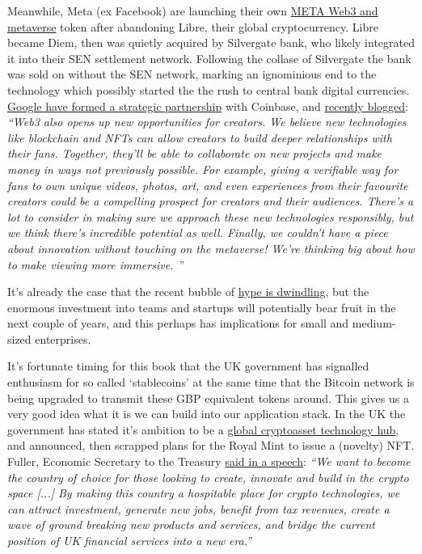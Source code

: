 Meanwhile, Meta (ex Facebook) are launching their own \href{https://archive.ph/coyp2}{META Web3 and metaverse} token after abandoning Libre, their global cryptocurrency. Libre became Diem, then was quietly acquired by Silvergate bank, who likely integrated it into their SEN settlement network. Following the collase of Silvergate the bank was sold on without the SEN network, marking an ignominious end to the technology which possibly started the the rush to central bank digital currencies. \href{https://www.coinbase.com/blog/announcing-coinbase-google-cloud}{Google have formed a strategic partnership} with Coinbase, and \href{https://blog.youtube/inside-youtube/innovations-for-2022-at-youtube/}{recently blogged}: \textit{``Web3 also opens up new opportunities for creators. We believe new technologies like blockchain and NFTs can allow creators to build deeper relationships with their fans. Together, they'll be able to collaborate on new projects and make money in ways not previously possible. For example, giving a verifiable way for fans to own unique videos, photos, art, and even experiences from their favourite creators could be a compelling prospect for creators and their audiences. There's a lot to consider in making sure we approach these new technologies responsibly, but we think there's incredible potential as well. Finally, we couldn't have a piece about innovation without touching on the metaverse! We're thinking big about how to make viewing more immersive. ''}\par
It's already the case that the recent bubble of \href{https://www.forbes.com/sites/paultassi/2022/03/10/interest-in-nfts-and-the-metaverse-is-falling-fast/?}{hype is dwindling}, but the enormous investment into teams and startups will potentially bear fruit in the next couple of years, and this perhaps has implications for small and medium-sized enterprises.\par
It's fortunate timing for this book that the UK government has signalled enthusiasm for so called `stablecoins' at the same time that the Bitcoin network is being upgraded to transmit these GBP equivalent tokens around. This gives us a very good idea what it is we can build into our application stack. In the UK the government has stated it's ambition to be a \href{https://www.gov.uk/government/news/government-sets-out-plan-to-make-uk-a-global-cryptoasset-technology-hub}{global cryptoasset technology hub}, and announced, then scrapped plans for the Royal Mint to issue a (novelty) NFT. Fuller, Economic Secretary to the Treasury \href{https://drive.google.com/file/d/19ZYKLeT-ds3TueTpqSM22MUqB4gmN_Pl/view}{said in a speech}: \textit{``We want to become the country of choice for those looking to create, innovate and build in the crypto space [...] By making this country a hospitable place for crypto technologies, we can attract investment, generate new jobs, benefit from tax revenues, create a wave of ground breaking new products and services, and bridge the current position of UK financial services into a new era.''}\par
